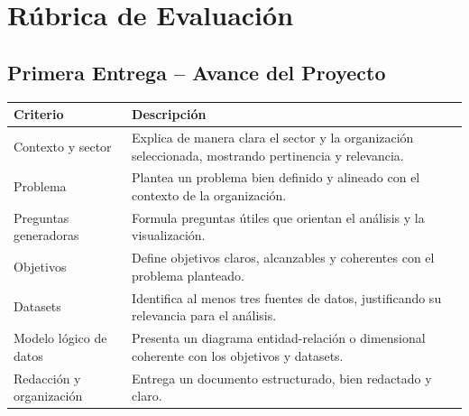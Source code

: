 \documentclass[12pt, spanish]{article}
\begin{document}
\section*{Rúbrica de Evaluación}

\subsection*{Primera Entrega – Avance del Proyecto}
\begin{table}[h!]
\centering
\begin{tabular}{|p{4cm}|p{10cm}|}
\hline
\textbf{Criterio} & \textbf{Descripción} \\
\hline
Contexto y sector & Explica de manera clara el sector y la organización seleccionada, mostrando pertinencia y relevancia. \\
\hline
Problema & Plantea un problema bien definido y alineado con el contexto de la organización. \\
\hline
Preguntas generadoras & Formula preguntas útiles que orientan el análisis y la visualización. \\
\hline
Objetivos & Define objetivos claros, alcanzables y coherentes con el problema planteado. \\
\hline
Datasets & Identifica al menos tres fuentes de datos, justificando su relevancia para el análisis. \\
\hline
Modelo lógico de datos & Presenta un diagrama entidad-relación o dimensional coherente con los objetivos y datasets. \\
\hline
Redacción y organización & Entrega un documento estructurado, bien redactado y claro. \\
\hline
\end{tabular}
\end{table}
\end{document}
